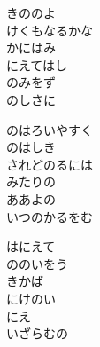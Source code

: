 \documentclass[10pt,b5j]{tarticle} %
\begin{document}
\vspace{1.5em} %
\newcommand{\linespace}{0.5em} %
\newcommand{\blocksize}{0.5\hsize} %
\begin{enumerate} %
    \begin{minipage}[c]{\blocksize}
    
        \vspace{\linespace}
        \item
        きののよ\\
        けくもなるかな\\
        かにはみ\\
        にえてはし\\
        のみをず\\
        のしさに
        
        \vspace{\linespace}
        \item
        のはろいやすく\\
        のはしき\\
        されどのるには\\
        みたりの\\
        ああよの\\
        いつのかるをむ
        
        \vspace{\linespace}
        \item
        はにえて\\
        ののいをう\\
        きかば\\
        にけのい\\
        にえ\\
        いざらむの
        

\end{minipage}
\end{enumerate}
\end{document}
